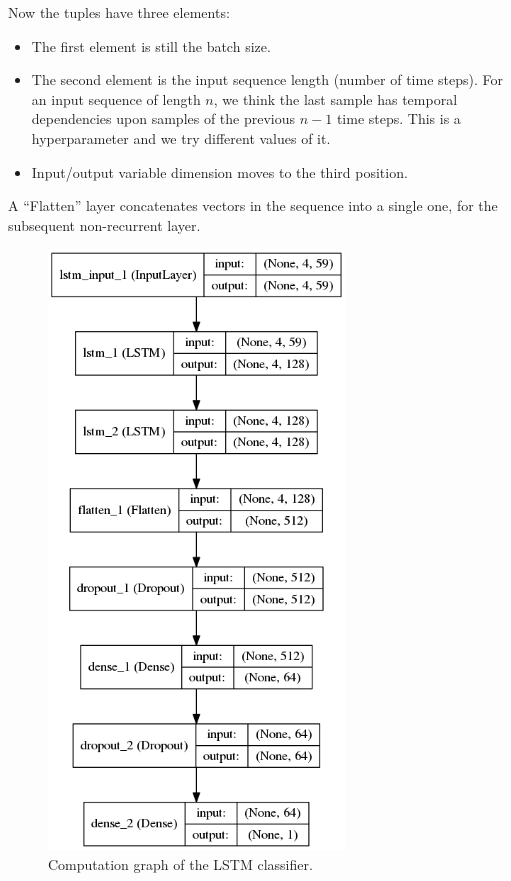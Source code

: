 \documentclass[11pt,a4paper]{report}
\begin{document}
Now the tuples have three elements:

\begin{itemize}
  \item The first element is still the batch size.
  \item The second element is the input sequence length (number of time steps).
    For an input sequence of length \(n\), we think the last sample has temporal dependencies upon samples of the previous \(n-1\) time steps.
    This is a hyperparameter and we try different values of it.
  \item Input/output variable dimension moves to the third position.
\end{itemize}

A \enquote{Flatten} layer concatenates vectors in the sequence into a single one, for the subsequent non-recurrent layer.

\begin{figure}[htbp]
  \centering
  \includegraphics[width=0.7\textwidth]{model-lstm.png}
  \caption{Computation graph of the LSTM classifier.} \label{fig:lstm}
\end{figure}
\end{document}
